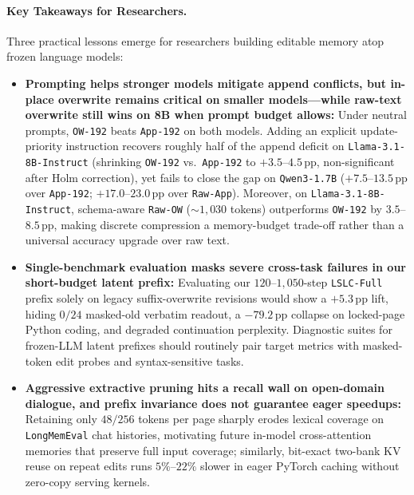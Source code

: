 \documentclass[11pt]{article}
\newcommand{\pp}{\,\text{pp}}
\renewcommand{\_}{\origunderscore\allowbreak}
\begin{document}
\paragraph{Key Takeaways for Researchers.}
Three practical lessons emerge for researchers building editable memory atop frozen language models:
\begin{itemize}
    \item \textbf{Prompting helps stronger models mitigate append conflicts, but in-place overwrite remains critical on smaller models---while raw-text overwrite still wins on 8B when prompt budget allows:} Under neutral prompts, \texttt{OW-192} beats \texttt{App-192} on both models. Adding an explicit update-priority instruction recovers roughly half of the append deficit on \texttt{Llama-3.1-8B-Instruct} (shrinking \texttt{OW-192} vs.\ \texttt{App-192} to $+3.5$--$4.5\pp$, non-significant after Holm correction), yet fails to close the gap on \texttt{Qwen3-1.7B} ($+7.5$--$13.5\pp$ over \texttt{App-192}; $+17.0$--$23.0\pp$ over \texttt{Raw-App}). Moreover, on \texttt{Llama-3.1-8B-Instruct}, schema-aware \texttt{Raw-OW} ($\sim 1{,}030$ tokens) outperforms \texttt{OW-192} by $3.5$--$8.5\pp$, making discrete compression a memory-budget trade-off rather than a universal accuracy upgrade over raw text.
    \item \textbf{Single-benchmark evaluation masks severe cross-task failures in our short-budget latent prefix:} Evaluating our $120$--$1{,}050$-step \texttt{LSLC-Full} prefix solely on legacy suffix-overwrite revisions would show a $+5.3\pp$ lift, hiding $0/24$ masked-old verbatim readout, a $-79.2\pp$ collapse on locked-page Python coding, and degraded continuation perplexity. Diagnostic suites for frozen-LLM latent prefixes should routinely pair target metrics with masked-token edit probes and syntax-sensitive tasks.
    \item \textbf{Aggressive extractive pruning hits a recall wall on open-domain dialogue, and prefix invariance does not guarantee eager speedups:} Retaining only $48/256$ tokens per page sharply erodes lexical coverage on \texttt{LongMemEval} chat histories, motivating future in-model cross-attention memories that preserve full input coverage; similarly, bit-exact two-bank KV reuse on repeat edits runs $5\%$--$22\%$ slower in eager PyTorch caching without zero-copy serving kernels.
\end{itemize}
\end{document}
